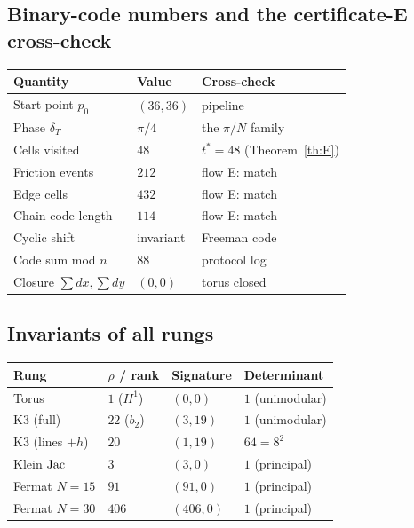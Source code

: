 \subsection{Binary-code numbers and the certificate-E cross-check}

\begin{center}
\small
\begin{tabular}{@{}l l l@{}}
\toprule
Quantity & Value & Cross-check \\
\midrule
Start point $p_0$ & $(36,36)$ & pipeline \\
Phase $\delta_T$ & $\pi/4$ & the $\pi/N$ family \\
Cells visited & $48$ & $t^*=48$ (Theorem~\ref{th:E}) \\
Friction events & $212$ & flow E: match \\
Edge cells & $432$ & flow E: match \\
Chain code length & $114$ & flow E: match \\
Cyclic shift & invariant & Freeman code \\
Code sum mod $n$ & $88$ & protocol log \\
Closure $\sum dx,\sum dy$ & $(0,0)$ & torus closed \\
\bottomrule
\end{tabular}
\end{center}

\subsection{Invariants of all rungs}

\begin{center}
\small
\begin{tabular}{@{}l l l l@{}}
\toprule
Rung & $\rho$ / rank & Signature & Determinant \\
\midrule
Torus & $1$ ($H^1$) & $(0,0)$ & $1$ (unimodular) \\
K3 (full) & $22$ ($b_2$) & $(3,19)$ & $1$ (unimodular) \\
K3 (lines $+h$) & $20$ & $(1,19)$ & $64=8^2$ \\
Klein $\operatorname{Jac}$ & $3$ & $(3,0)$ & $1$ (principal) \\
Fermat $N=15$ & $91$ & $(91,0)$ & $1$ (principal) \\
Fermat $N=30$ & $406$ & $(406,0)$ & $1$ (principal) \\
\bottomrule
\end{tabular}
\end{center}

